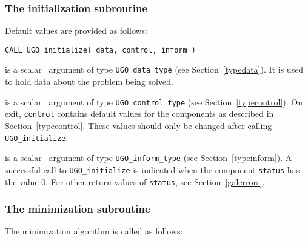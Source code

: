\documentclass{galahad}
\newcommand{\packagename}{UGO}
\begin{document}

\subsubsection{The initialization subroutine}\label{subinit}
 Default values are provided as follows:
\vspace*{1mm}

\hspace{8mm}
{\tt CALL \packagename\_initialize( data, control, inform )}

\vspace*{-2mm}
\begin{description}

 is a scalar \intentinout\ argument of type
{\tt \packagename\_data\_type}
(see Section~\ref{typedata}). It is used to hold data about the problem being
solved.

 is a scalar \intentout\ argument of type
{\tt \packagename\_control\_type}
(see Section~\ref{typecontrol}).
On exit, {\tt control} contains default values for the components as
described in Section~\ref{typecontrol}.
These values should only be changed after calling
{\tt \packagename\_initialize}.

 is a scalar \intentout\ argument of type
{\tt \packagename\_inform\_type}
(see Section~\ref{typeinform}). A successful call to
{\tt \packagename\_initialize}
is indicated when the  component {\tt status} has the value 0.
For other return values of {\tt status}, see Section~\ref{galerrors}.

\end{description}


\subsubsection{The minimization subroutine}
The minimization algorithm is called as follows:
\vspace*{1mm}
\end{document}
